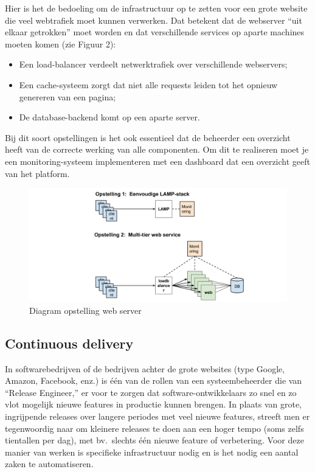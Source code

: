 Hier is het de bedoeling om de infrastructuur op te zetten voor een grote website die veel webtrafiek moet kunnen verwerken. Dat betekent dat de webserver ``uit elkaar getrokken'' moet worden en dat verschillende services op aparte machines moeten komen (zie Figuur 2):

\begin{itemize}
\item Een load-balancer verdeelt netwerktrafiek over verschillende webservers;
\item Een cache-systeem zorgt dat niet alle requests leiden tot het opnieuw genereren van een pagina;
\item De database-backend komt op een aparte server.
\end{itemize}

Bij dit soort opstellingen is het ook essentieel dat de beheerder een overzicht heeft van de correcte werking van alle componenten. Om dit te realiseren moet je een monitoring-systeem implementeren met een dashboard dat een overzicht geeft van het platform.

\begin{figure}[htbp]
\centering
\includegraphics[width=\textwidth]{img/assignment-ha.png}
\caption{Diagram opstelling web server}
\end{figure}

\subsection{Continuous delivery}
\label{subs:continuous-delivery}

In softwarebedrijven of de bedrijven achter de grote websites (type Google, Amazon, Facebook, enz.) is één van de rollen van een systeembeheerder die van ``Release Engineer,'' er voor te zorgen dat software-ontwikkelaars zo snel en zo vlot mogelijk nieuwe features in productie kunnen brengen. In plaats van grote, ingrijpende releases over langere periodes met veel nieuwe features, streeft men er tegenwoordig naar om kleinere releases te doen aan een hoger tempo (soms zelfs tientallen per dag), met bv.~slechts één nieuwe feature of verbetering. Voor deze manier van werken is specifieke infrastructuur nodig en is het nodig een aantal zaken te automatiseren.


